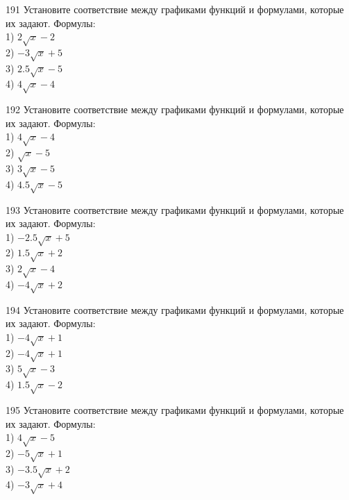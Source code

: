 \documentclass[4apaper]{article}
\begin{document}
\begin{taskBN}{191}
Установите соответствие между графиками функций и формулами, которые их задают. Формулы: \\1) $2\sqrt{x}-2$\\2) $-3\sqrt{x}+5$\\3) $2.5\sqrt{x}-5$\\4) $4\sqrt{x}-4$
\end{taskBN}

\begin{taskBN}{192}
Установите соответствие между графиками функций и формулами, которые их задают. Формулы: \\1) $4\sqrt{x}-4$\\2) $\sqrt{x}-5$\\3) $3\sqrt{x}-5$\\4) $4.5\sqrt{x}-5$
\end{taskBN}

\begin{taskBN}{193}
Установите соответствие между графиками функций и формулами, которые их задают. Формулы: \\1) $-2.5\sqrt{x}+5$\\2) $1.5\sqrt{x}+2$\\3) $2\sqrt{x}-4$\\4) $-4\sqrt{x}+2$
\end{taskBN}

\begin{taskBN}{194}
Установите соответствие между графиками функций и формулами, которые их задают. Формулы: \\1) $-4\sqrt{x}+1$\\2) $-4\sqrt{x}+1$\\3) $5\sqrt{x}-3$\\4) $1.5\sqrt{x}-2$
\end{taskBN}

\begin{taskBN}{195}
Установите соответствие между графиками функций и формулами, которые их задают. Формулы: \\1) $4\sqrt{x}-5$\\2) $-5\sqrt{x}+1$\\3) $-3.5\sqrt{x}+2$\\4) $-3\sqrt{x}+4$
\end{taskBN}
\end{document}

